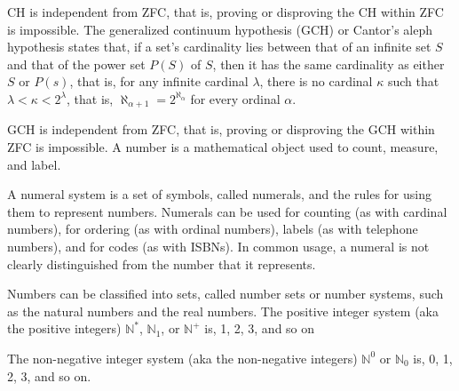 \documentclass[a4paper,12pt]{report}
\begin{document}
\begin{itemizle}
CH is independent from ZFC, that is, proving or disproving the CH within ZFC is impossible.
The generalized continuum hypothesis (GCH) or Cantor's aleph hypothesis states that, if a set's cardinality lies between that of an infinite set $S$ and that of the power set $P(S)$ of $S$, then it has the same cardinality as either $S$ or $P(s)$, that is, for any infinite cardinal $\lambda$, there is no cardinal $\kappa$ such that $\lambda <\kappa <2^{\lambda }$, that is, $\aleph _{\alpha +1}=2^{\aleph _{\alpha }}$ for every ordinal $\alpha$.

GCH is independent from ZFC, that is, proving or disproving the GCH within ZFC is impossible.
A number is a mathematical object used to count, measure, and label.

A numeral system is a set of symbols, called numerals, and the rules for using them to represent numbers. Numerals can be used for counting (as with cardinal numbers), for ordering (as with ordinal numbers), labels (as with telephone numbers), and for codes (as with ISBNs). In common usage, a numeral is not clearly distinguished from the number that it represents.

Numbers can be classified into sets, called number sets or number systems, such as the natural numbers and the real numbers.
The positive integer system (aka the positive integers) $\mathbb{N}^*$, $\mathbb{N}_1$, or $\mathbb{N}^+$ is, 1, 2, 3, and so on

The non-negative integer system (aka the non-negative integers) $\mathbb{N}^0$ or $\mathbb{N}_0$ is, 0, 1, 2, 3, and so on.


\end{itemizle}
\end{document}
